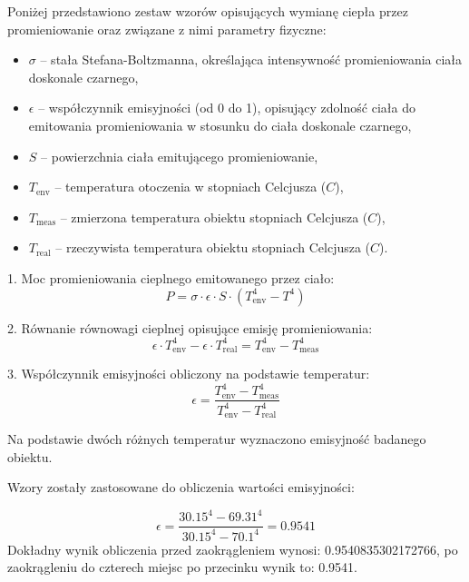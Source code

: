 
Poniżej przedstawiono zestaw wzorów opisujących wymianę ciepła przez promieniowanie oraz związane z nimi parametry fizyczne:

\begin{itemize}
    \item \(\sigma\) – stała Stefana-Boltzmanna, określająca intensywność promieniowania ciała doskonale czarnego,
    \item \(\epsilon\) – współczynnik emisyjności (od 0 do 1), opisujący zdolność ciała do emitowania promieniowania w stosunku do ciała doskonale czarnego,
    \item \(S\) – powierzchnia ciała emitującego promieniowanie,
    \item \(T_{\text{env}}\) – temperatura otoczenia w stopniach Celcjusza (\(C\)),
    \item \(T_{\text{meas}}\) – zmierzona temperatura obiektu stopniach Celcjusza (\(C\)),
    \item \(T_{\text{real}}\) – rzeczywista temperatura obiektu stopniach Celcjusza (\(C\)).
\end{itemize}

\newpage

1. Moc promieniowania cieplnego emitowanego przez ciało:
\[
P = \sigma \cdot \epsilon \cdot S \cdot \left( T_{\text{env}}^4 - T^4 \right)
\]

2. Równanie równowagi cieplnej opisujące emisję promieniowania:
\[
\epsilon \cdot T_{\text{env}}^4 - \epsilon \cdot T_{\text{real}}^4 = T_{\text{env}}^4 - T_{\text{meas}}^4
\]

3. Współczynnik emisyjności obliczony na podstawie temperatur:
\[
\epsilon = \frac{T_{\text{env}}^4 - T_{\text{meas}}^4}{T_{\text{env}}^4 - T_{\text{real}}^4}
\]

Na podstawie dwóch różnych temperatur wyznaczono emisyjność badanego obiektu. 

\vspace{12pt}

Wzory zostały zastosowane do obliczenia wartości emisyjności:

\[
\epsilon = \frac{30.15^4 - 69.31^4}{30.15^4 - 70.1^4} = 0.9541
\]
Dokładny wynik obliczenia przed zaokrągleniem wynosi: 0.9540835302172766, po zaokrągleniu do czterech miejsc po przecinku wynik to: 0.9541.